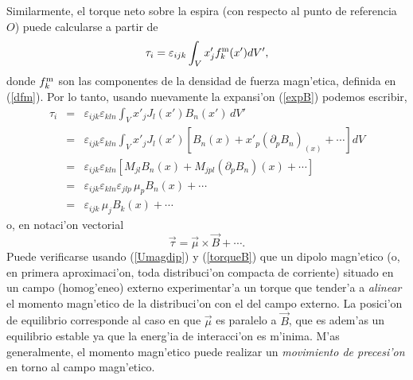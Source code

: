 Similarmente, el torque neto sobre la espira (con respecto al punto de referencia $O$)  puede calcularse a partir de
\begin{equation}
 \tau_i=\varepsilon_{ijk}\int_V x'_j f^{\rm m}_k(x') dV',
\end{equation}
donde $f^{\rm m}_k$ son las componentes de la densidad de fuerza magn'etica,
definida en (\ref{dfm}). Por lo tanto, usando nuevamente la expansi'on
(\ref{expB}) podemos escribir,
\begin{eqnarray}
  \tau_i&=&\varepsilon_{ijk}\varepsilon_{kln}\int_V x'_j J_l(x')B_n(x')\, dV' \\
&=&\varepsilon_{ijk}\varepsilon_{kln}\int_V x'_j
J_l(x')\left[B_n(x)+x'_p(\partial_pB_n)_(x) +\cdots\right] dV \\
&=&\varepsilon_{ijk}\varepsilon_{kln}\left[M_{jl}B_n(x)+M_{jpl}(\partial_pB_n)(x)
+\cdots\right] \\
&=&\varepsilon_{ijk}\varepsilon_{kln}\varepsilon_{jlp}\,\mu_pB_n(x)+\cdots\\
&=&\varepsilon_{ijk}\,\mu_jB_k(x)+\cdots 
\end{eqnarray}
o, en notaci'on vectorial
\begin{equation}
 \boxed{\vec{\tau}=\vec{\mu}\times\vec{B}+\cdots .} \label{torqueB}
\end{equation}
Puede verificarse usando (\ref{Umagdip}) y (\ref{torqueB}) que un dipolo
magn'etico (o, en primera aproximaci'on, toda distribuci'on compacta de
corriente) situado en un campo (homog'eneo) externo experimentar'a un torque
que tender'a a \textit{alinear} el momento magn'etico de la distribuci'on con el
del campo externo. La posici'on de equilibrio corresponde al caso en que
$\vec{\mu}$ es paralelo a $\vec{B}$, que es adem'as un equilibrio estable ya
que la energ'ia de interacci'on es m'inima. M'as generalmente, el momento
magn'etico puede realizar un \textit{movimiento de precesi'on} en torno al campo
magn'etico.


